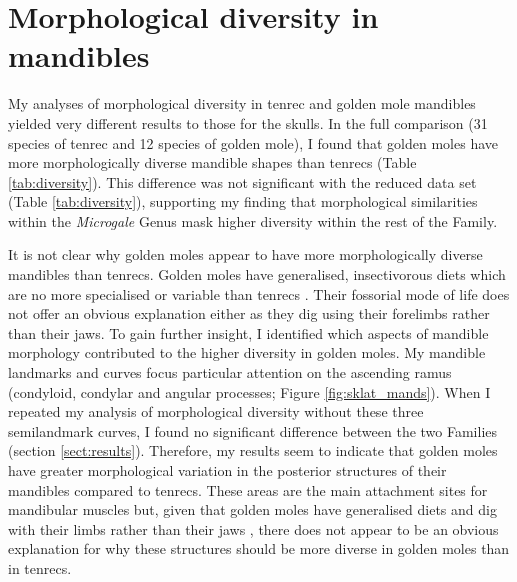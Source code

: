 \section{Morphological diversity in mandibles}
	My analyses of morphological diversity in tenrec and golden mole mandibles yielded very different results to those for the skulls. In the full comparison (31 species of tenrec and 12 species of golden mole), I found that golden moles have more morphologically diverse mandible shapes than tenrecs (Table \ref{tab:diversity}). This difference was not significant with the reduced data set (Table \ref{tab:diversity}), supporting my finding that morphological similarities within the \textit{Microgale} Genus mask higher diversity within the rest of the Family.
	
	It is not clear why golden moles appear to have more morphologically diverse mandibles than tenrecs. Golden moles have generalised, insectivorous diets \citep{Bronner1995} which are no more specialised or variable than tenrecs \citep{Soarimalala2011}. Their fossorial mode of life does not offer an obvious explanation either as they dig using their forelimbs rather than their jaws.
	To gain further insight, I identified which aspects of mandible morphology contributed to the higher diversity in golden moles. My mandible landmarks and curves focus particular attention on the ascending ramus (condyloid, condylar and angular processes; Figure \ref{fig:sklat_mands}). When I repeated my analysis of morphological diversity without these three semilandmark curves, I found no significant difference between the two Families (section \ref{sect:results}). Therefore, my results seem to indicate that golden moles have greater morphological variation in the posterior structures of their mandibles compared to tenrecs. These areas are the main attachment sites for mandibular muscles but, given that golden moles have generalised diets and dig with their limbs rather than their jaws \citep{Bronner1995}, there does not appear to be an obvious explanation for why these structures should be more diverse in golden moles than in tenrecs.
	

